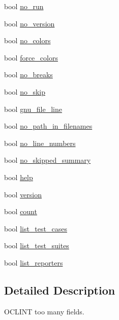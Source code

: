 \begin{DoxyCompactItemize}
\item 
bool \hyperlink{structdoctest_1_1_context_options_aad35f517c65f792ddc72a672d9014222}{no\+\_\+run}
\item 
bool \hyperlink{structdoctest_1_1_context_options_ad7371979d5134b109dd00fba771b0271}{no\+\_\+version}
\item 
bool \hyperlink{structdoctest_1_1_context_options_a4fc9b6673b818b8cb5969725f16b59c3}{no\+\_\+colors}
\item 
bool \hyperlink{structdoctest_1_1_context_options_a8cd276e86a209f3d5486eb6c5a2a29bf}{force\+\_\+colors}
\item 
bool \hyperlink{structdoctest_1_1_context_options_af82a6fc802b8ed33a84ea96e85b0d911}{no\+\_\+breaks}
\item 
bool \hyperlink{structdoctest_1_1_context_options_a56344ffa781ee4da6cbf3f6c11da8564}{no\+\_\+skip}
\item 
bool \hyperlink{structdoctest_1_1_context_options_aab894e731a6fc86cf095288ec7d0c0f2}{gnu\+\_\+file\+\_\+line}
\item 
bool \hyperlink{structdoctest_1_1_context_options_a1e9a8bf8feba5cfe25558e5977c4bd7c}{no\+\_\+path\+\_\+in\+\_\+filenames}
\item 
bool \hyperlink{structdoctest_1_1_context_options_a880207c3b4cc98fc5c8d94998841e837}{no\+\_\+line\+\_\+numbers}
\item 
bool \hyperlink{structdoctest_1_1_context_options_a4e22eec59e63ed4ff6ab4dfce2389c99}{no\+\_\+skipped\+\_\+summary}
\item 
bool \hyperlink{structdoctest_1_1_context_options_a9d542a95ee03f61c233fff51e7461400}{help}
\item 
bool \hyperlink{structdoctest_1_1_context_options_a08931527a9e5e634e64a336e5493a7c1}{version}
\item 
bool \hyperlink{structdoctest_1_1_context_options_a4651b5efbaf2ffc03d60fb4140d21dd3}{count}
\item 
bool \hyperlink{structdoctest_1_1_context_options_a813e1543c358ab8a7a432b4ad2b32e56}{list\+\_\+test\+\_\+cases}
\item 
bool \hyperlink{structdoctest_1_1_context_options_a579399a66b278cbf96b6183d337f486b}{list\+\_\+test\+\_\+suites}
\item 
bool \hyperlink{structdoctest_1_1_context_options_ad3daf077ac3182db5175f8baff49fce0}{list\+\_\+reporters}
\end{DoxyCompactItemize}


\subsection{Detailed Description}
O\+C\+L\+I\+NT too many fields. 

